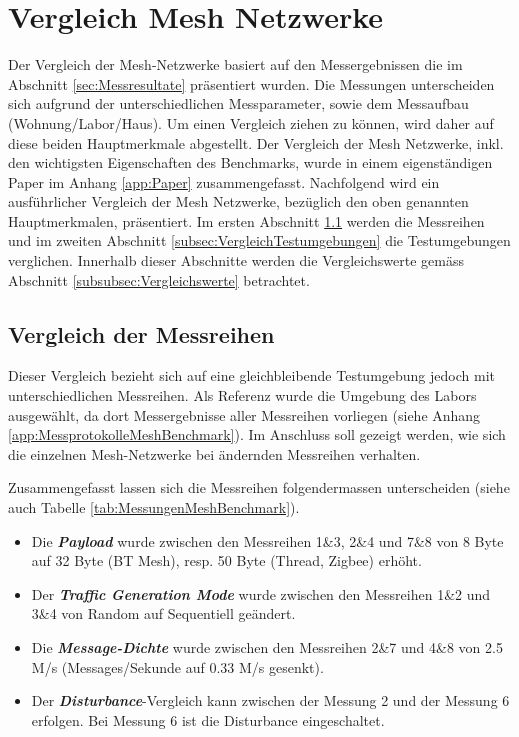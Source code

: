 \clearpage

\section{Vergleich Mesh Netzwerke}\label{sec:VergleichMeshNetzwerke}
Der Vergleich der Mesh-Netzwerke basiert auf den Messergebnissen die im Abschnitt \ref{sec:Messresultate} präsentiert wurden.
Die Messungen unterscheiden sich aufgrund der unterschiedlichen Messparameter, sowie dem Messaufbau (Wohnung/Labor/Haus).
Um einen Vergleich ziehen zu können, wird daher auf diese beiden Hauptmerkmale abgestellt.
Der Vergleich der Mesh Netzwerke, inkl. den wichtigsten Eigenschaften des Benchmarks, wurde in einem eigenständigen Paper im Anhang \ref{app:Paper} zusammengefasst.
Nachfolgend wird ein ausführlicher Vergleich der Mesh Netzwerke, bezüglich den oben genannten Hauptmerkmalen, präsentiert.
Im ersten Abschnitt \ref{subsec:VergleichMessreihen} werden die Messreihen und im zweiten Abschnitt \ref{subsec:VergleichTestumgebungen} die Testumgebungen verglichen.
Innerhalb dieser Abschnitte werden die Vergleichswerte gemäss Abschnitt \ref{subsubsec:Vergleichswerte} betrachtet.

\subsection{Vergleich der Messreihen}\label{subsec:VergleichMessreihen}
Dieser Vergleich bezieht sich auf eine gleichbleibende Testumgebung jedoch mit unterschiedlichen Messreihen.
Als Referenz wurde die Umgebung des Labors ausgewählt, da dort Messergebnisse aller Messreihen vorliegen (siehe Anhang \ref{app:MessprotokolleMeshBenchmark}).
Im Anschluss soll gezeigt werden, wie sich die einzelnen Mesh-Netzwerke bei ändernden Messreihen verhalten.

Zusammengefasst lassen sich die Messreihen folgendermassen unterscheiden (siehe auch Tabelle \ref{tab:MessungenMeshBenchmark}). 

\begin{itemize}
	\item Die \textbf{\textit{Payload}} wurde zwischen den Messreihen 1\&3, 2\&4 und 7\&8 von 8 Byte auf 32 Byte (BT Mesh), resp. 50 Byte (Thread, Zigbee) erhöht.
	\item  Der \textbf{\textit{Traffic Generation Mode}} wurde zwischen den Messreihen 1\&2 und 3\&4 von Random auf Sequentiell geändert.
	\item Die \textbf{\textit{Message-Dichte}} wurde zwischen den Messreihen 2\&7 und 4\&8 von 2.5 M/s (Messages/Sekunde auf 0.33 M/s gesenkt).
	\item Der \textbf{\textit{Disturbance}}-Vergleich kann zwischen der Messung 2 und der Messung 6 erfolgen. Bei Messung 6 ist die Disturbance eingeschaltet.
\end{itemize}

